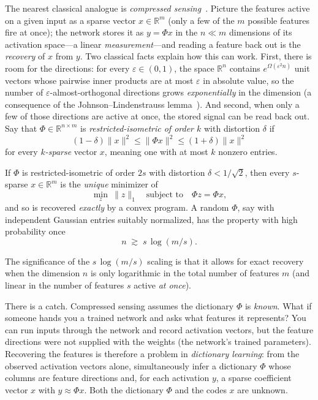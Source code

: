 The nearest classical analogue is \emph{compressed sensing}~\cite{candes2006,donoho2006}. Picture the features active on a given input as a sparse vector $x\in\mathbb{R}^m$ (only a few of the $m$ possible features fire at once); the network stores it as $y=\Phi x$ in the $n\ll m$ dimensions of its activation space---a linear \emph{measurement}---and reading a feature back out is the \emph{recovery} of $x$ from $y$. Two classical facts explain how this can work. First, there is room for the directions: for every $\varepsilon\in(0,1)$, the space $\mathbb{R}^n$ contains $e^{\Omega(\varepsilon^2 n)}$ unit vectors whose pairwise inner products are at most $\varepsilon$ in absolute value, so the number of $\varepsilon$-almost-orthogonal directions grows \emph{exponentially} in the dimension (a consequence of the Johnson--Lindenstrauss lemma~\cite{johnson1984}). And second, when only a few of those directions are active at once, the stored signal can be read back out. Say that $\Phi\in\mathbb{R}^{n\times m}$ is \emph{restricted-isometric of order $k$} with distortion $\delta$ if
\[
   (1-\delta)\|x\|^2\le\|\Phi x\|^2\le(1+\delta)\|x\|^2
\]
for every \emph{$k$-sparse} vector $x$, meaning one with at most $k$ nonzero entries.

\begin{theorem*}
If $\Phi$ is restricted-isometric of order $2s$ with distortion $\delta<1/\sqrt{2}$, then every $s$-sparse $x\in\mathbb{R}^m$ is the \emph{unique} minimizer of
\[
   \min_{z}\ \|z\|_1 \quad\text{subject to}\quad \Phi z=\Phi x,
\]
and so is recovered \emph{exactly} by a convex program. A random $\Phi$, say with independent Gaussian entries suitably normalized, has the property with high probability once
\[
   n \;\gtrsim\; s\,\log(m/s).
\]
\end{theorem*}

The significance of the $s\, \log(m/s)$ scaling is that it allows for exact recovery when the dimension $n$ is only logarithmic in the total number of features $m$ (and linear in the number of features $s$ active \emph{at once}).

There is a catch.
Compressed sensing assumes the dictionary $\Phi$ is \emph{known}.
What if someone hands you a trained network and asks what features it
represents?
You can run inputs through the network and record activation vectors,
but the feature directions were not supplied with the
weights (the network's trained parameters).
Recovering the features is therefore a problem in \emph{dictionary learning}:
from the observed activation vectors alone, simultaneously infer a dictionary
$\Phi$ whose columns are feature directions and, for each activation $y$,
a sparse coefficient vector $x$ with $y\approx\Phi x$.
Both the dictionary $\Phi$ and the codes $x$ are unknown.

